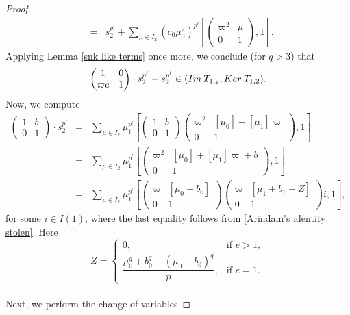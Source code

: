 \documentclass[10pt,a4paper]{amsart}
\newcommand{\Ker}{\rm{Ker}\>}
\newcommand{\im}{\rm{Im}\>}
\begin{document}
\begin{proof}
\begin{eqnarray*}
  &=& s_{2}^{p^l}+\sum_{\mu \in I_2}(c_{0}\mu_{0}^2)^{p^l}\left[\begin{pmatrix} \varpi^{2} & \mu  \\ 0 & 1\end{pmatrix}, 1 \right].
\end{eqnarray*}
Applying Lemma \ref{snk like terms} once more, we conclude (for $q > 3$) that
\[
\begin{pmatrix}
      1 & 0 \\
      \varpi c & 1 
  \end{pmatrix} \cdot s_{2}^{p^l}-s_{2}^{p^l} \in ({\im} T_{1,2} , {\Ker} T_{1,2}) .
\]
Now, we compute
\begin{eqnarray*}
 \begin{pmatrix}
      1 & b \\
      0 & 1 
  \end{pmatrix} \cdot s_{2}^{p^l} & = & \sum_{\mu \in I_2}\mu_{1}^{p^l}\left[\begin{pmatrix}
      1 & b \\
      0 & 1 
  \end{pmatrix} \begin{pmatrix} \varpi^{2} & [\mu_{0}]+[\mu_1]\varpi  \\ 0 & 1\end{pmatrix}, 1\right]\\
  &=& \sum_{\mu \in I_2}\mu_{1}^{p^l}\left[\begin{pmatrix} \varpi^{2} & [\mu_{0}]+[\mu_1]\varpi+b  \\ 0 & 1\end{pmatrix}, 1\right]\\
  &=& \sum_{\mu \in I_2}\mu_{1}^{p^l}\left[\begin{pmatrix} \varpi & [\mu_{0}+b_0]  \\ 0 & 1\end{pmatrix}\begin{pmatrix} \varpi & [\mu_1+b_1+Z]  \\ 0 & 1\end{pmatrix}i, 1\right],
\end{eqnarray*}
for some $i \in I(1)$, where the last equality follows from \eqref{Arindam's identity stolen}. Here
\[
Z=\begin{cases}
      0, &  \text{if } e>1, \\
      \dfrac{\mu_0^{q}+b_0^{q}-(\mu_{0}+b_0)^q}{p}, & \text{if } e=1.
  \end{cases}
\] \\
Next, we perform the change of variables

\end{proof}
\end{document}
